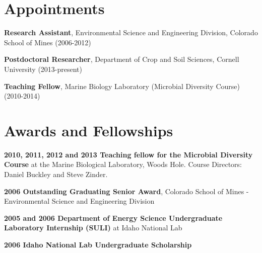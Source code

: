 \documentclass[letterpaper]{article}
\renewenvironment{itemize}{
  \begin{list}{}{
    \setlength{\leftmargin}{1.5em}
  }
}{
  \end{list}
}
\begin{document}

\section*{Appointments}
\begin{itemize}
    \item \textbf{Research Assistant}, Environmental Science and Engineering
        Division, Colorado School of Mines (2006-2012)
    \item \textbf{Postdoctoral Researcher}, Department of Crop and Soil
        Sciences, Cornell University (2013-present)
    \item \textbf{Teaching Fellow}, Marine Biology Laboratory (Microbial
        Diversity Course) (2010-2014)
\end{itemize}
\section*{Awards and Fellowships}
\begin{itemize}
    \item \textbf{2010, 2011, 2012 and 2013 Teaching fellow for the Microbial
        Diversity Course} at the Marine Biological Laboratory, Woods
        Hole.  Course Directors: Daniel Buckley and Steve Zinder.
    \item \textbf{2006 Outstanding Graduating Senior Award}, Colorado School of Mines - Environmental Science and Engineering Division
    \item \textbf{2005 and 2006 Department of Energy Science Undergraduate Laboratory Internship
        (SULI)} at Idaho National Lab
    \item \textbf{2006 Idaho National Lab Undergraduate Scholarship}
\end{itemize}
\end{document}
